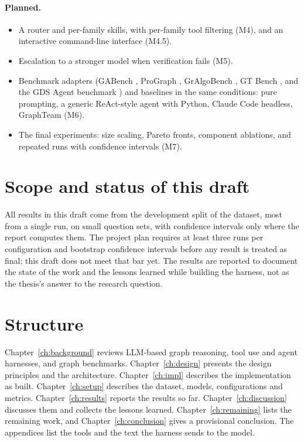 \paragraph{Planned.}
\begin{itemize}
  \item A router and per-family skills, with per-family tool filtering (M4), and an interactive command-line
        interface (M4.5).
  \item Escalation to a stronger model when verification fails (M5).
  \item Benchmark adapters (GABench \cite{gabench}, ProGraph \cite{prograph}, GrAlgoBench \cite{gralgobench},
        GT Bench \cite{gtbench}, and the GDS Agent benchmark \cite{gdsagentbench}) and baselines in the same
        conditions: pure prompting, a generic ReAct-style agent with Python, Claude Code headless, GraphTeam
        \cite{graphteam} (M6).
  \item The final experiments: size scaling, Pareto fronts, component ablations, and repeated runs with confidence
        intervals (M7).
\end{itemize}

\section{Scope and status of this draft}

All results in this draft come from the development split of the dataset, most from a single run, on small question
sets, with confidence intervals only where the report computes them. The project plan requires at least three runs
per configuration and bootstrap confidence intervals before any result is treated as final; this draft does not meet
that bar yet. The results are reported to document the state of the work and the lessons learned while building the
harness, not as the thesis's answer to the research question.

\section{Structure}

Chapter~\ref{ch:background} reviews LLM-based graph reasoning, tool use and agent harnesses, and graph benchmarks.
Chapter~\ref{ch:design} presents the design principles and the architecture. Chapter~\ref{ch:impl} describes the
implementation as built. Chapter~\ref{ch:setup} describes the dataset, models, configurations and metrics.
Chapter~\ref{ch:results} reports the results so far. Chapter~\ref{ch:discussion} discusses them and collects the
lessons learned. Chapter~\ref{ch:remaining} lists the remaining work, and Chapter~\ref{ch:conclusion} gives a
provisional conclusion. The appendices list the tools and the text the harness sends to the model.

